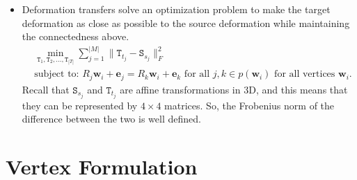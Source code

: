 \documentclass[10pt]{article}
\newcommand{\ve}[1]{\mathbf{#1}}
\newcommand{\mtt}[1]{\mathtt{#1}}
\begin{document}
\begin{itemize}
\begin{itemize}
        \item We require that shared vertices be transformed to the same position. In other words, let $\ve{w}_i$ be a vertex in the target mesh, and let $p(\ve{w}_i)$ be the set of triangles that contains $\ve{w}_i$. We require that
        \begin{align*}
            R_j \ve{w}_i + \ve{e}_j = R_k \ve{w}_i + \ve{e}_k
        \end{align*}
        for all $j, k \in p(\ve{w}_i)$.
    \end{itemize}

    \item Deformation transfers solve an optimization problem to make the target deformation as close as possible to the source deformation while maintaining the connectedness above.
    \begin{align*}
        & \min_{\mtt{T}_1, \mtt{T}_2, \ldots, \mtt{T}_{|T|}} \sum_{j=1}^{|M|} \| \mtt{T}_{t_j} - \mtt{S}_{s_j} \|^2_F \\
        & \mbox{subject to: } R_j \ve{w}_i + \ve{e}_j = R_k \ve{w}_i + \ve{e}_k \mbox{ for all } j, k \in p(\ve{w}_i) \mbox{ for all vertices } \ve{w}_i.
    \end{align*}
    Recall that $\mtt{S}_{s_j}$ and $\mtt{T}_{t_j}$ are affine transformations in 3D, and this means that they can be represented by $4 \times 4$ matrices. So, the Frobenius norm of the difference between the two is well defined.
\end{itemize}

\section{Vertex Formulation}
\end{document}
